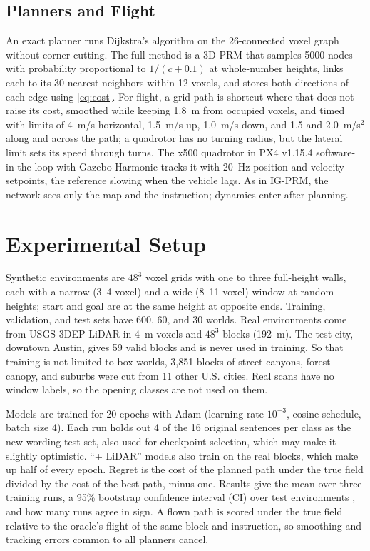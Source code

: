 \documentclass[conference]{IEEEtran}
\begin{document}
\subsection{Planners and Flight}
An exact planner runs Dijkstra's algorithm \cite{dijkstra1959} on the 26-connected voxel graph without corner cutting. The full method is a 3D PRM that samples 5000 nodes with probability proportional to $1/(c+0.1)$ at whole-number heights, links each to its 30 nearest neighbors within 12 voxels, and stores both directions of each edge using \eqref{eq:cost}. For flight, a grid path is shortcut where that does not raise its cost, smoothed while keeping 1.8~m from occupied voxels, and timed with limits of 4~m/s horizontal, 1.5~m/s up, 1.0~m/s down, and 1.5 and 2.0~m/s$^2$ along and across the path; a quadrotor has no turning radius, but the lateral limit sets its speed through turns. The x500 quadrotor in PX4 v1.15.4 software-in-the-loop with Gazebo Harmonic tracks it with 20~Hz position and velocity setpoints, the reference slowing when the vehicle lags. As in IG-PRM, the network sees only the map and the instruction; dynamics enter after planning.

\section{Experimental Setup}
Synthetic environments are $48^3$ voxel grids with one to three full-height walls, each with a narrow (3--4 voxel) and a wide (8--11 voxel) window at random heights; start and goal are at the same height at opposite ends. Training, validation, and test sets have 600, 60, and 30 worlds. Real environments come from USGS 3DEP LiDAR \cite{usgs3dep} in 4~m voxels and $48^3$ blocks (192~m). The test city, downtown Austin, gives 59 valid blocks and is never used in training. So that training is not limited to box worlds, 3,851 blocks of street canyons, forest canopy, and suburbs were cut from 11 other U.S. cities. Real scans have no window labels, so the opening classes are not used on them.

Models are trained for 20 epochs with Adam \cite{kingma2015adam} (learning rate $10^{-3}$, cosine schedule, batch size 4). Each run holds out 4 of the 16 original sentences per class as the new-wording test set, also used for checkpoint selection, which may make it slightly optimistic. ``+ LiDAR'' models also train on the real blocks, which make up half of every epoch. Regret is the cost of the planned path under the true field divided by the cost of the best path, minus one. Results give the mean over three training runs, a 95\% bootstrap confidence interval (CI) over test environments \cite{efron1979bootstrap}, and how many runs agree in sign. A flown path is scored under the true field relative to the oracle's flight of the same block and instruction, so smoothing and tracking errors common to all planners cancel.
\end{document}
